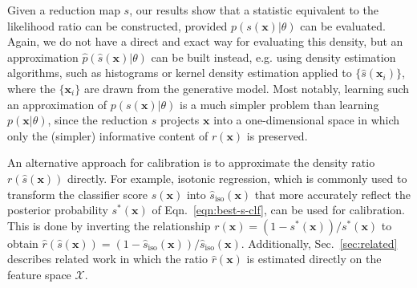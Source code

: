\documentclass[12pt]{article}
\numberwithin{equation}{section}
\theoremstyle{plain}
\begin{document}
Given a reduction map $s$, our results show that a statistic equivalent to the
likelihood ratio can be constructed, provided $p(s(\mathbf{x})|\theta)$ can be
evaluated. Again, we do not have a direct and exact way for evaluating this
density, but an approximation $\hat p(\hat s(\mathbf{x})| \theta)$ can be built
instead, e.g. using density estimation algorithms, such as
histograms or kernel density estimation applied to $\{\hat
s(\mathbf{x}_i)\}$, where the $\{\mathbf{x}_i\}$  are drawn from the generative
model. Most notably, learning such an approximation of $p(s(\mathbf{x})|\theta)$
is a much simpler problem than learning $p(\mathbf{x}|\theta)$, since the
reduction $s$ projects $\mathbf{x}$ into a one-dimensional space in which only
the (simpler) informative content of $r(\mathbf{x})$ is preserved.

An alternative approach for calibration is to approximate the density ratio
$r(\hat{s}(\mathbf{x}))$ directly.
For example, isotonic regression, which is commonly used to transform the classifier score  $\hat{s}(\mathbf{x})$ into $\hat{s}_\textrm{iso}(\mathbf{x})$ that more accurately reflect  the posterior probability $s^*(\mathbf{x})$
of Eqn.~\ref{eqn:best-s-clf}, can be used for calibration. This is done by inverting the relationship ${r}(\mathbf{x}) = (1-s^*(\mathbf{x}))/s^*(\mathbf{x})$ to obtain $\hat{r}(\hat{s}(\mathbf{x})) = (1-\hat{s}_\textrm{iso}(\mathbf{x}))/\hat{s}_\textrm{iso}(\mathbf{x})$.
Additionally, Sec.~\ref{sec:related} describes related work in which the ratio $\hat{r}(\mathbf{x})$ is estimated directly on the feature space $\mathcal{X}$.


\end{document}
